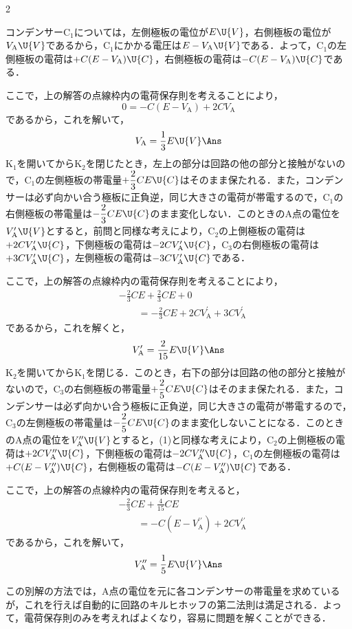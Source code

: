 \begin{multicols}{2}
\begin{bekkai}
\begin{komon}
       コンデンサー$\mathrm{C}_1$については，左側極板の電位が$E\U{V}$，右側極板の電位が$V_{\mathrm{A}}\U{V}$であるから，$\mathrm{C}_1$にかかる電圧は$E-V_{\mathrm{A}}\U{V}$である．よって，$\mathrm{C}_1$の左側極板の電荷は$+C(E-V_{\mathrm{A}})\U{C}$，右側極板の電荷は$-C(E-V_{\mathrm{A}})\U{C}$である．

       ここで，上の解答の点線枠内の電荷保存則を考えることにより，
       \[0=-C(E-V_{\mathrm{A}})+2CV_{\mathrm{A}}\]
       であるから，これを解いて，
       \[V_{\mathrm{A}}=\frac{1}{3}E\U{V}\Ans\]
 $\mathrm{K}_1$を開いてから$\mathrm{K}_2$を閉じたとき，左上の部分は回路の他の部分と接触がないので，$\mathrm{C}_1$の左側極板の帯電量$+\dfrac{2}{3}CE\U{C}$はそのまま保たれる．また，コンデンサーは必ず向かい合う極板に正負逆，同じ大きさの電荷が帯電するので，$\mathrm{C}_1$の右側極板の帯電量は$-\dfrac{2}{3}CE\U{C}$のまま変化しない．このときの$\mathrm{A}$点の電位を$V_{\mathrm{A}}^\prime\U{V}$とすると，前問と同様な考えにより，$\mathrm{C}_2$の上側極板の電荷は$+2CV_{\mathrm{A}}^\prime\U{C}$，下側極板の電荷は$-2CV_{\mathrm{A}}^\prime\U{C}$，$\mathrm{C}_3$の右側極板の電荷は$+3CV_{\mathrm{A}}^\prime\U{C}$，左側極板の電荷は$-3CV_{\mathrm{A}}^\prime\U{C}$である．

       ここで，上の解答の点線枠内の電荷保存則を考えることにより，
       \[\begin{aligned}
         &-\frac{2}{3}CE+\frac{2}{3}CE+0\\
         &\qquad=-\frac{2}{3}CE+2CV_{\mathrm{A}}^\prime+3CV_{\mathrm{A}}^\prime
       \end{aligned}\]
       であるから，これを解くと，
       \[V_{\mathrm{A}}^\prime=\frac{2}{15}E\U{V}\Ans\]
 $\mathrm{K}_2$を開いてから$\mathrm{K}_1$を閉じる．このとき，右下の部分は回路の他の部分と接触がないので，$\mathrm{C}_3$の右側極板の帯電量$+\dfrac{2}{5}CE\U{C}$はそのまま保たれる．また，コンデンサーは必ず向かい合う極板に正負逆，同じ大きさの電荷が帯電するので，$\mathrm{C}_3$の左側極板の帯電量は$-\dfrac{2}{5}CE\U{C}$のまま変化しないことになる．このときの$\mathrm{A}$点の電位を$V_{\mathrm{A}}^{\prime\prime}\U{V}$とすると，(1)と同様な考えにより，$\mathrm{C}_2$の上側極板の電荷は$+2CV_{\mathrm{A}}^{\prime\prime}\U{C}$，下側極板の電荷は$-2CV_{\mathrm{A}}^{\prime\prime}\U{C}$，$\mathrm{C}_1$の左側極板の電荷は$+C(E-V_{\mathrm{A}}^{\prime\prime})\U{C}$，右側極板の電荷は$-C(E-V_{\mathrm{A}}^{\prime\prime})\U{C}$である．

       ここで，上の解答の点線枠内の電荷保存則を考えると，
       \[\begin{aligned}
         &-\frac{2}{3}CE+\frac{4}{15}CE\\
         &\qquad=-C(E-V_{\mathrm{A}}^{\prime\prime})+2CV_{\mathrm{A}}^{\prime\prime}
       \end{aligned}\]
       であるから，これを解いて，
       \[V_{\mathrm{A}}^{\prime\prime}=\frac{1}{5}E\U{V}\Ans\]
\end{komon}
この別解の方法では，$\mathrm{A}$点の電位を元に各コンデンサーの帯電量を求めているが，これを行えば自動的に回路のキルヒホッフの第二法則は満足される．よって，電荷保存則のみを考えればよくなり，容易に問題を解くことができる．


\end{bekkai}
\end{multicols}

